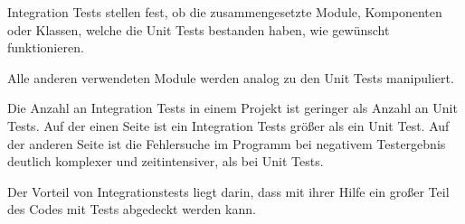 Integration Tests stellen fest, ob die zusammengesetzte Module, Komponenten oder Klassen, welche die Unit Tests bestanden haben, wie gewünscht funktionieren.

Alle anderen verwendeten Module werden analog zu den Unit Tests manipuliert.

Die Anzahl an Integration Tests in einem Projekt ist geringer als Anzahl an Unit Tests.
Auf der einen Seite ist ein Integration Tests größer als ein Unit Test. 
Auf der anderen Seite ist die Fehlersuche im Programm bei negativem Testergebnis deutlich komplexer und zeitintensiver, 
als bei Unit Tests.

Der Vorteil von Integrationstests liegt darin, dass mit ihrer Hilfe ein großer Teil des Codes mit Tests abgedeckt werden kann.